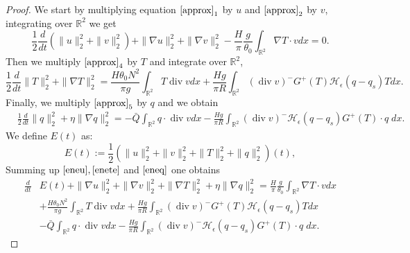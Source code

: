 \documentclass[11pt, a4paper, article,reqno,]{amsart}
\theoremstyle{remark}
\DeclareMathOperator{\dive}{div}
\numberwithin{equation}{section}
\begin{document}
\begin{proof}
We start by multiplying equation $\eqref{approx}_1$ by $u$ and $\eqref{approx}_2$ by $v$, integrating over $\mathbb{R}^2$ we get
\begin{equation}\label{eneu}
         \frac{1}{2} \frac{d}{dt} \left( \|u\|^2_2 + \|v\|^2_2  \right) +  \|\nabla u\|^2_2 +  \|\nabla v\|^2_2 
        - \frac{H}{\pi} \frac{g}{\theta_0} \int_{\mathbb{R}^2} \nabla T  \cdot v dx = 0.
\end{equation}
Then we multiply $\eqref{approx}_4$ by $T$ and integrate over $\mathbb{R}^2$,
\begin{equation}\label{enete}
    \frac{1}{2} \frac{d}{dt} \|T\|^2_2 +  \|\nabla T\|_2^2 =  \frac{H \theta_0 N^2}{\pi g} \int_{\mathbb{R}^2} T \dive v dx+ \frac{Hg}{\pi R}\int_{\mathbb{R}^2} (\dive v)^- G^+(T)\mathcal{H}_\epsilon(q-q_s) T dx.
\end{equation}
Finally, we multiply $\eqref{approx}_5$ by $q$ and we obtain
\begin{equation}\label{eneq}
\begin{aligned}
    & \frac{1}{2} \frac{d}{dt} \|q\|_2^2 + \eta \|\nabla q\|_2^2 = - \bar{Q} \int_{\mathbb{R}^2} q \cdot \dive v dx - \frac{Hg}{\pi R}\int_{\mathbb{R}^2}(\dive v)^- \mathcal{H}_\epsilon(q-q_s) G^+(T)  \cdot q \; dx.
\end{aligned}
\end{equation}
We define $E(t)$ as:
\begin{equation*}
    E(t):= \frac{1}{2} \left(\|u\|_2^2 + \|v\|_2^2 +  \|T\|_2^2 + \|q\|_2^2 \right)(t),
\end{equation*}
Summing up $\eqref{eneu}, \eqref{enete}$ and $\eqref{eneq}$ one obtains 
\begin{equation}\label{der_ene}
    \begin{aligned}
        \frac{d}{dt} & E(t)  + \|\nabla u\|_2^2 + \|\nabla v\|_2^2 +  \|\nabla T\|_2^2 + \eta \|\nabla q\|_2^2 = \frac{H}{\pi} \frac{g}{\theta_0} \int_{\mathbb{R}^2} \nabla T  \cdot v dx \\
        &  +  \frac{H \theta_0 N^2}{\pi g} \int_{\mathbb{R}^2} T \dive v dx + \frac{Hg}{\pi R}\int_{\mathbb{R}^2} (\dive v)^- G^+(T)\mathcal{H}_\epsilon(q-q_s) T dx \\
        &- \bar{Q} \int_{\mathbb{R}^2} q \cdot \dive v dx - \frac{Hg}{\pi R}\int_{\mathbb{R}^2}(\dive v)^- \mathcal{H}_\epsilon(q-q_s) G^+(T)  \cdot q \; dx.
    \end{aligned}
\end{equation}


\end{proof}
\end{document}

